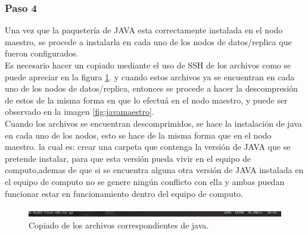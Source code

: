 \subsubsection{Paso 4}
Una vez que la paquetería de JAVA esta correctamente instalada en el nodo maestro, se procede a instalarla en cada uno de los nodos de datos/replica que fueron configurados.\\
Es necesario hacer un copiado mediante el uso de SSH de los archivos como se puede apreciar en la figura \ref{fig:copiajava}. y cuando estos archivos ya se encuentran en cada uno de los nodos de datos/replica, entonces se procede a hacer la descompresión de estos de la misma forma en que lo efectuá en el nodo maestro, y puede ser observado en la imagen \ref{fig:javamaestro}.
\\
Cuando los archivos se encuentran descomprimidos, se hace la instalación de java en cada uno de los nodos, esto se hace de la misma forma que en el nodo maestro. la cual es: crear una carpeta que contenga la versión de JAVA que se pretende instalar, para que esta versión pueda vivir en el equipo de computo,ademas de que si se encuentra alguna otra versión de JAVA instalada en el equipo de computo no se genere ningún conflicto con ella y ambas puedan funcionar estar en funcionamiento dentro del equipo de computo.
\begin{figure}[H]
	\hypertarget{fig:copiajava}{\hspace{1pt}}
	\begin{center}	
		\includegraphics[width=.9\textwidth]{capitulo5/images/copiaeinstalacionjava.png}
		\caption{Copiado de los archivos correspondientes de java.}
		\label{fig:copiajava}
	\end{center}
\end{figure}

